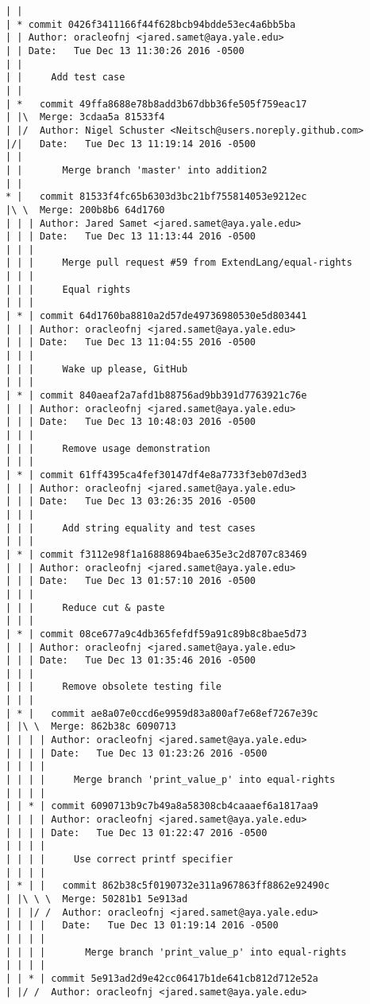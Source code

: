 \begin{lstlisting}
| |   
| * commit 0426f3411166f44f628bcb94bdde53ec4a6bb5ba
| | Author: oracleofnj <jared.samet@aya.yale.edu>
| | Date:   Tue Dec 13 11:30:26 2016 -0500
| | 
| |     Add test case
| |     
| *   commit 49ffa8688e78b8add3b67dbb36fe505f759eac17
| |\  Merge: 3cdaa5a 81533f4
| |/  Author: Nigel Schuster <Neitsch@users.noreply.github.com>
|/|   Date:   Tue Dec 13 11:19:14 2016 -0500
| |   
| |       Merge branch 'master' into addition2
| |     
* |   commit 81533f4fc65b6303d3bc21bf755814053e9212ec
|\ \  Merge: 200b8b6 64d1760
| | | Author: Jared Samet <jared.samet@aya.yale.edu>
| | | Date:   Tue Dec 13 11:13:44 2016 -0500
| | | 
| | |     Merge pull request #59 from ExtendLang/equal-rights
| | |     
| | |     Equal rights
| | |    
| * | commit 64d1760ba8810a2d57de49736980530e5d803441
| | | Author: oracleofnj <jared.samet@aya.yale.edu>
| | | Date:   Tue Dec 13 11:04:55 2016 -0500
| | | 
| | |     Wake up please, GitHub
| | |    
| * | commit 840aeaf2a7afd1b88756ad9bb391d7763921c76e
| | | Author: oracleofnj <jared.samet@aya.yale.edu>
| | | Date:   Tue Dec 13 10:48:03 2016 -0500
| | | 
| | |     Remove usage demonstration
| | |    
| * | commit 61ff4395ca4fef30147df4e8a7733f3eb07d3ed3
| | | Author: oracleofnj <jared.samet@aya.yale.edu>
| | | Date:   Tue Dec 13 03:26:35 2016 -0500
| | | 
| | |     Add string equality and test cases
| | |    
| * | commit f3112e98f1a16888694bae635e3c2d8707c83469
| | | Author: oracleofnj <jared.samet@aya.yale.edu>
| | | Date:   Tue Dec 13 01:57:10 2016 -0500
| | | 
| | |     Reduce cut & paste
| | |    
| * | commit 08ce677a9c4db365fefdf59a91c89b8c8bae5d73
| | | Author: oracleofnj <jared.samet@aya.yale.edu>
| | | Date:   Tue Dec 13 01:35:46 2016 -0500
| | | 
| | |     Remove obsolete testing file
| | |      
| * |   commit ae8a07e0ccd6e9959d83a800af7e68ef7267e39c
| |\ \  Merge: 862b38c 6090713
| | | | Author: oracleofnj <jared.samet@aya.yale.edu>
| | | | Date:   Tue Dec 13 01:23:26 2016 -0500
| | | | 
| | | |     Merge branch 'print_value_p' into equal-rights
| | | |     
| | * | commit 6090713b9c7b49a8a58308cb4caaaef6a1817aa9
| | | | Author: oracleofnj <jared.samet@aya.yale.edu>
| | | | Date:   Tue Dec 13 01:22:47 2016 -0500
| | | | 
| | | |     Use correct printf specifier
| | | |       
| * | |   commit 862b38c5f0190732e311a967863ff8862e92490c
| |\ \ \  Merge: 50281b1 5e913ad
| | |/ /  Author: oracleofnj <jared.samet@aya.yale.edu>
| | | |   Date:   Tue Dec 13 01:19:14 2016 -0500
| | | |   
| | | |       Merge branch 'print_value_p' into equal-rights
| | | |     
| | * | commit 5e913ad2d9e42cc06417b1de641cb812d712e52a
| |/ /  Author: oracleofnj <jared.samet@aya.yale.edu>

\end{lstlisting}
